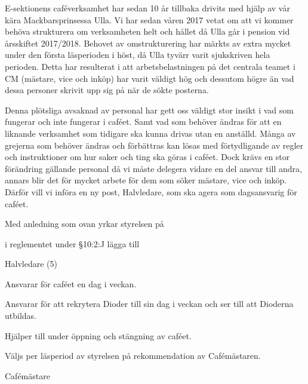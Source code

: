 \documentclass[../_main/handlingar.tex]{subfiles}
\begin{document}
E-sektionens caféverksamhet har sedan 10 år tillbaka drivits med hjälp av vår kära Mackbarsprinsessa Ulla. Vi har sedan våren 2017 vetat om att vi kommer behöva strukturera om verksamheten helt och hållet då Ulla går i pension vid årsskiftet 2017/2018. Behovet av omstrukturering har märkts av extra mycket under den första läsperioden i höst, då Ulla tyvärr varit sjukskriven hela perioden. Detta har resulterat i att arbetsbelastningen på det centrala teamet i CM (mästare, vice och inköp) har varit väldigt hög och dessutom högre än vad dessa personer skrivit upp sig på när de sökte posterna.

Denna plötsliga avsaknad av personal har gett oss väldigt stor insikt i vad som fungerar och inte fungerar i caféet. Samt vad som behöver ändras för att en liknande verksamhet som tidigare ska kunna drivas utan en anställd. Många av grejerna som behöver ändras och förbättras kan lösas med förtydligande av regler och instruktioner om hur saker och ting ska göras i caféet. Dock krävs en stor förändring gällande personal då vi måste delegera vidare en del ansvar till andra, annars blir det för mycket arbete för dem som söker mästare, vice och inköp. Därför vill vi införa en ny post, Halvledare, som ska agera som dagsansvarig för caféet.

Med anledning som ovan yrkar styrelsen på
\begin{attsatser}
    \att i reglementet under \S10:2:J lägga till\par
        Halvledare (5)
        \begin{tightdashlist}
            \item Ansvarar för caféet en dag i veckan.
            \item Ansvarar för att rekrytera Dioder till sin dag i veckan och ser till att Dioderna utbildas.
            \item Hjälper till under öppning och stängning av caféet.
            \item Väljs per läsperiod av styrelsen på rekommendation av Cafémästaren.
        \end{tightdashlist}
\end{attsatser}

\begin{signatures}{1}
    \ist
    \signature{Daniel Bakic}{Cafémästare}
\end{signatures}
\end{document}
